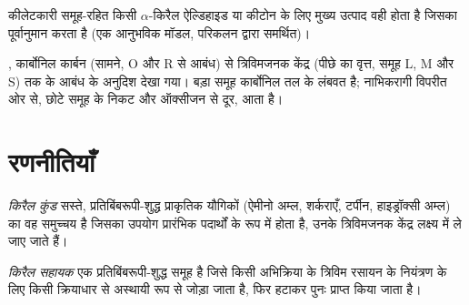 \begin{proposition}\label{prop:b3:asymmetric-synthesis:felkin}
कीलेटकारी समूह-रहित किसी $\alpha$-किरैल ऐल्डिहाइड या कीटोन के लिए मुख्य
उत्पाद वही होता है जिसका पूर्वानुमान  करता है (एक आनुभविक मॉडल,
परिकलन द्वारा समर्थित)। \admitted
\end{proposition}

\begin{omfigure}

{\small {}, कार्बोनिल कार्बन (सामने, O और R से
आबंध) से त्रिविमजनक केंद्र (पीछे का वृत्त, समूह L, M और S) तक के आबंध के अनुदिश देखा गया।
बड़ा समूह कार्बोनिल तल के लंबवत है; नाभिकरागी
विपरीत ओर से, छोटे समूह के निकट और ऑक्सीजन से दूर, आता है।}
\end{omfigure}

\section{रणनीतियाँ}

\begin{definition}[किरैल कुंड]\label{def:b3:asymmetric-synthesis:chiral-pool}
\emph{किरैल कुंड} सस्ते, प्रतिबिंबरूपी-शुद्ध
प्राकृतिक यौगिकों (ऐमीनो अम्ल, शर्कराएँ, टर्पीन, हाइड्रॉक्सी अम्ल) का वह समुच्चय है जिसका उपयोग
प्रारंभिक पदार्थों के रूप में होता है, उनके त्रिविमजनक केंद्र लक्ष्य में ले जाए जाते हैं।
\end{definition}

\begin{definition}[किरैल सहायक]\label{def:b3:asymmetric-synthesis:auxiliary}
\emph{किरैल सहायक} एक प्रतिबिंबरूपी-शुद्ध समूह है जिसे
किसी अभिक्रिया के त्रिविम रसायन के नियंत्रण के लिए किसी क्रियाधार से अस्थायी रूप से जोड़ा जाता है,
फिर हटाकर पुनः प्राप्त किया जाता है।
\end{definition}

